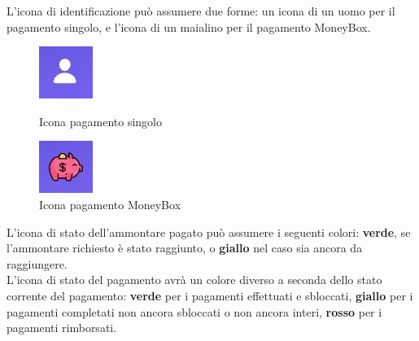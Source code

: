             L'icona di identificazione può assumere due forme: un icona di un uomo per il pagamento singolo, e l'icona di un maialino per il pagamento MoneyBox.

            \begin{figure}[H]
                \centering
                \begin{minipage}{0.45\textwidth}
                    \centering
                    \includegraphics[scale=1]{immagini/uomo.jpg} 
                    \caption{Icona pagamento singolo}
                \end{minipage}\hfill
                \begin{minipage}{0.45\textwidth}
                 \centering
                    \includegraphics[scale=1]{immagini/piggy.jpg} 
                    \caption{Icona pagamento MoneyBox}
                \end{minipage}
            \end{figure}

            L'icona di stato dell'ammontare pagato può assumere i seguenti colori: \textbf{verde}, se l'ammontare richiesto è stato raggiunto, o \textbf{giallo} nel caso sia ancora da raggiungere.\\

            L'icona di stato del pagamento avrà un colore diverso a seconda dello stato corrente del pagamento: \textbf{verde} per i pagamenti effettuati e sbloccati, 
            \textbf{giallo} per i pagamenti completati non ancora sbloccati o non ancora interi, \textbf{rosso} per i pagamenti rimborsati.

